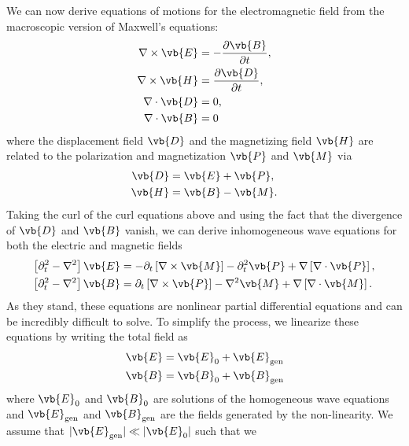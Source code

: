 \documentclass[11pt,SymmetricalJury]{inrsthesis/inrsthesis}
\begin{document}
We can now derive equations of motions for the electromagnetic field from the
macroscopic version of Maxwell's equations:
  \begin{subequations}
  \begin{align}
    \nabla\times\vb{E} &= -\frac{\partial\vb{B}}{\partial t}, \\
    \nabla\times\vb{H} &=  \frac{\partial\vb{D}}{\partial t}, \\
    \nabla\cdot\vb{D}  &= 0, \\
    \nabla\cdot\vb{B}  &= 0
  \end{align}
  \end{subequations}
where the displacement field $\vb{D}$ and the magnetizing field $\vb{H}$ are
related to the polarization and magnetization $\vb{P}$ and $\vb{M}$ via
  \begin{subequations}
  \begin{align}
    \vb{D}  &=\vb{E}+\vb{P}, \\
    \vb{H}  &=\vb{B}-\vb{M}.
  \end{align}
  \end{subequations}
Taking the curl of the curl equations above and using the fact that the
divergence of $\vb{D}$ and $\vb{B}$ vanish, we can derive inhomogeneous
wave equations for both the electric and magnetic fields
  \begin{subequations}
  \begin{align}
    \left[\partial_t^2-\nabla^2\right]\vb{E}
                  &= -\partial_t\left[\nabla\times\vb{M}\right]-\partial_t^2\vb{P}+\nabla\left[\nabla\cdot\vb{P}\right], \\
    \left[\partial_t^2-\nabla^2\right]\vb{B}
                  &= \partial_t\left[\nabla\times\vb{P}\right]-\nabla^2\vb{M}+\nabla\left[\nabla\cdot\vb{M}\right].
  \end{align}
  \end{subequations}
As they stand, these equations are nonlinear partial differential equations and
can be incredibly difficult to solve. To simplify the process, we linearize these
equations by writing the total field as
  \begin{align}
    \vb{E}  &= \vb{E}_0 + \vb{E}_\text{gen} \\
    \vb{B}  &= \vb{B}_0 + \vb{B}_\text{gen}
  \end{align}
where $\vb{E}_0$ and $\vb{B}_0$ are solutions of the homogeneous wave equations
and $\vb{E}_\text{gen}$ and $\vb{B}_\text{gen}$ are the fields generated by the
non-linearity. We assume that $|\vb{E}_\text{gen}|\ll|\vb{E}_0|$ such that we
\end{document}
